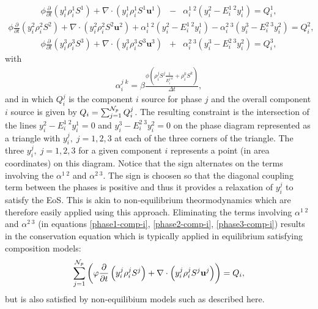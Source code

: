 \begin{eqnarray}
\phi  \displaystyle\frac{\partial}{\partial t}\left(y_{i}^{1}\rho_i^{1}S^{1} \right) +
\nabla\cdot\left(y_{i}^{1}\rho_i^{1}S^{1}\mathbf{u}^{1}  \right) &-& \alpha_i^{1\;2} (y_i^2 - E_i^{1\;2} y_i^1)  = Q_i^1 ,
\label{phase1-comp-i}
\end{eqnarray}
\begin{eqnarray}
\phi \displaystyle\frac{\partial}{\partial t}\left(y_{i}^{2}\rho_i^{2}S^{2}  \right) + 
 \nabla\cdot\left( y_{i}^{2}\rho_i^{2}S^{2}\mathbf{u}^{2}  \right) + \alpha_i^{1\;2} (y_i^2 - E_i^{1\;2} y_i^1)   - \alpha_i^{2\;3} (y_i^3 - E_i^{2\;3} y_i^2) = Q_i^2 ,
\label{phase2-comp-i}
\end{eqnarray}
\begin{eqnarray}
\phi \displaystyle\frac{\partial}{\partial t}\left(y_{i}^{3}\rho_i^{3}S^{3}  \right) + 
 \nabla\cdot\left( y_{i}^{3}\rho_i^{3}S^{3}\mathbf{u}^{3}  \right) &+&  \alpha_i^{2\;3} (y_i^3 - E_i^{2\;3} y_i^2) = Q_i^3  ,
\label{phase3-comp-i}
\end{eqnarray}
with 
\begin{eqnarray}
 \alpha_i^{j\;k} = \beta \frac{\phi (\rho_i^j S^j 
 \frac{1}{E_i^{j\;k}} 
 +\rho_i^k S^k )}{\Delta t} , 
\end{eqnarray}
and in which $Q_i^j$ is the component $i$ source for phase $j$ 
and the overall component $i$ source is given by $Q_i=\sum_{j=1}^{{\cal N}_p} Q_i^j$. 
The resulting constraint 
is the intersection of the lines $y_i^2 - E_i^{1\;2} y_i^1=0$ and 
$y_i^3 - E_i^{2\;3} y_i^2= 0$ on the phase diagram represented as a triangle 
with $y_i^j, \; j =1,2,3$ at each of the three corners of the triangle. 
The three $y_i^j, \; j =1,2,3$ for a given component $i$ represents a point (in area coordinates) 
on this diagram. Notice that the sign alternates on the 
terms involving the $\alpha^{1\;2}$ and $\alpha^{2\;3}$. 
The sign is choosen so 
that the diagonal coupling term between 
the phases is positive and thus it provides  
a relaxation of $y_i^j$ to satisfy the EoS. This is 
akin to non-equilibrium theormodynamics which are therefore easily 
applied using this approach. 
Eliminating the terms involving $\alpha^{1\;2}$ 
and $ \alpha^{2\;3} $ (in equations \ref{phase1-comp-i}, \ref{phase2-comp-i}, \ref{phase3-comp-i}) results in the conservation equation 
which is typically applied in equilibrium satisfying composition models: 
\begin{eqnarray}
\sum_{j=1}^{{\cal N}_p}  \left( 
\phi  \displaystyle\frac{\partial}{\partial t}\left(y_{i}^{j}\rho_i^{j}S^{j} \right) + 
\nabla\cdot\left(y_{i}^{j}\rho_i^{j}S^{j}\mathbf{u}^{j}  \right)  \right) = Q_i, 
\end{eqnarray}
but is also satisfied by non-equilibium models such as described here. 

